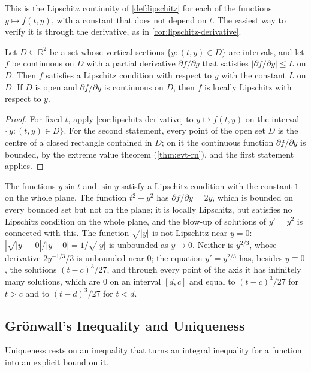 This is the Lipschitz continuity of \cref{def:lipschitz} for each of the functions $y\mapsto f(t,y)$, with a constant that does not depend on $t$. The easiest way to verify it is through the derivative, as in \cref{cor:lipschitz-derivative}.

\begin{proposition}
\label{prop:lipschitz-test}
Let $D\subseteq\mathbb R^2$ be a set whose vertical sections $\{y:(t,y)\in D\}$ are intervals, and let $f$ be continuous on $D$ with a partial derivative $\partial f/\partial y$ that satisfies $|\partial f/\partial y|\le L$ on $D$. Then $f$ satisfies a Lipschitz condition with respect to $y$ with the constant $L$ on $D$. If $D$ is open and $\partial f/\partial y$ is continuous on $D$, then $f$ is locally Lipschitz with respect to $y$.
\end{proposition}

\begin{proof}
For fixed $t$, apply \cref{cor:lipschitz-derivative} to $y\mapsto f(t,y)$ on the interval $\{y:(t,y)\in D\}$. For the second statement, every point of the open set $D$ is the centre of a closed rectangle contained in $D$; on it the continuous function $\partial f/\partial y$ is bounded, by the extreme value theorem (\cref{thm:evt-rn}), and the first statement applies.
\end{proof}

The functions $y\sin t$ and $\sin y$ satisfy a Lipschitz condition with the constant $1$ on the whole plane. The function $t^2+y^2$ has $\partial f/\partial y=2y$, which is bounded on every bounded set but not on the plane; it is locally Lipschitz, but satisfies no Lipschitz condition on the whole plane, and the blow-up of solutions of $y'=y^2$ is connected with this. The function $\sqrt{|y|}$ is not Lipschitz near $y=0$: $|\sqrt{|y|}-0|/|y-0|=1/\sqrt{|y|}$ is unbounded as $y\to0$. Neither is $y^{2/3}$, whose derivative $2y^{-1/3}/3$ is unbounded near $0$; the equation $y'=y^{2/3}$ has, besides $y\equiv0$, the solutions $(t-c)^3/27$, and through every point of the axis it has infinitely many solutions, which are $0$ on an interval $[d,c]$ and equal to $(t-c)^3/27$ for $t>c$ and to $(t-d)^3/27$ for $t<d$.

\subsection{Gr\"onwall's Inequality and Uniqueness}

Uniqueness rests on an inequality that turns an integral inequality for a function into an explicit bound on it.

